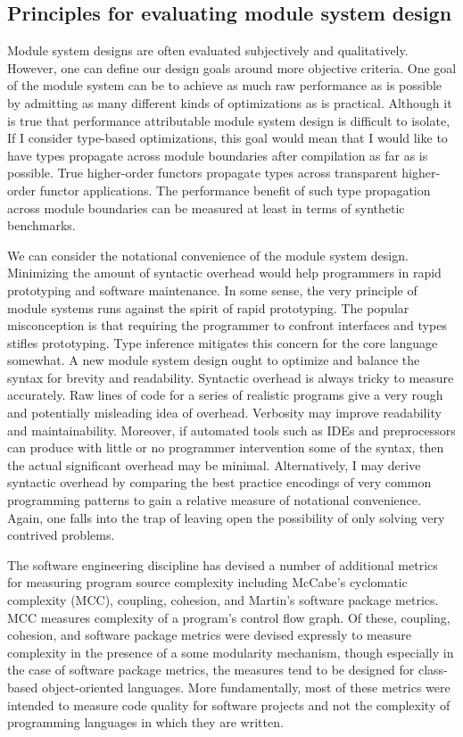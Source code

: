 \documentclass[12pt]{article}
\begin{document}
\subsection{Principles for evaluating module system design}
Module system designs are often evaluated subjectively and qualitatively. However, one can define our design goals around more objective criteria. One goal of the module system can be to achieve as much raw performance as is possible by admitting as many different kinds of optimizations as is practical. Although it is true that performance attributable module system design is difficult to isolate, If I consider type-based optimizations, this goal would mean that I would like to have types propagate across module boundaries after compilation as far as is possible. True higher-order functors propagate types across transparent higher-order functor applications. The performance benefit of such type propagation across module boundaries can be measured at least in terms of synthetic benchmarks. 

We can consider the notational convenience of the module system design. Minimizing the amount of syntactic overhead would help programmers in rapid prototyping and software maintenance. In some sense, the very principle of module systems runs against the spirit of rapid prototyping. The popular misconception is that requiring the programmer to confront interfaces and types stifles prototyping. Type inference mitigates this concern for the core language somewhat. A new module system design ought to optimize and balance the syntax for brevity and readability. Syntactic overhead is always tricky to measure accurately. Raw lines of code for a series of realistic programs give a very rough and potentially misleading idea of overhead. Verbosity may improve readability and maintainability. Moreover, if automated tools such as IDEs and preprocessors can produce with little or no programmer intervention some of the syntax, then the actual significant overhead may be minimal. Alternatively, I may derive syntactic overhead by comparing the best practice encodings of very common programming patterns to gain a relative measure of notational convenience. Again, one falls into the trap of leaving open the possibility of only solving very contrived problems. 

The software engineering discipline has devised a number of additional metrics for measuring program source complexity including McCabe's cyclomatic complexity (MCC), coupling, cohesion, and Martin's software package metrics. MCC measures complexity of a program's control flow graph. Of these, coupling, cohesion, and software package metrics were devised expressly to measure complexity in the presence of a some modularity mechanism, though especially in the case of software package metrics, the measures tend to be designed for class-based object-oriented languages. More fundamentally, most of these metrics were intended to measure code quality for software projects and not the complexity of programming languages in which they are written.
\end{document}
